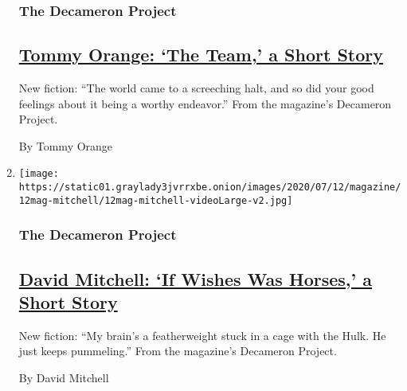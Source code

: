 \begin{enumerate}
{  \subsubsection{The Decameron Project}\label{the-decameron-project-1}}

  \hypertarget{tommy-orange-the-team-a-short-story}{%
  \subsection{\texorpdfstring{\href{/interactive/2020/07/07/magazine/tommy-orange-short-story.html}{Tommy
  Orange: `The Team,' a Short
  Story}}{Tommy Orange: `The Team,' a Short Story}}\label{tommy-orange-the-team-a-short-story}}

  New fiction: ``The world came to a screeching halt, and so did your
  good feelings about it being a worthy endeavor.'' From the magazine's
  Decameron Project.

  By Tommy Orange
\item
  \texttt{[image: https://static01.graylady3jvrrxbe.onion/images/2020/07/12/magazine/12mag-mitchell/12mag-mitchell-videoLarge-v2.jpg]}

  \hypertarget{the-decameron-project-2}{%
  \subsubsection{The Decameron Project}\label{the-decameron-project-2}}

  \hypertarget{david-mitchell-if-wishes-was-horses-a-short-story}{%
  \subsection{\texorpdfstring{\href{/interactive/2020/07/07/magazine/david-mitchell-short-story.html}{David
  Mitchell: `If Wishes Was Horses,' a Short
  Story}}{David Mitchell: `If Wishes Was Horses,' a Short Story}}\label{david-mitchell-if-wishes-was-horses-a-short-story}}

  New fiction: ``My brain's a featherweight stuck in a cage with the
  Hulk. He just keeps pummeling.'' From the magazine's Decameron
  Project.

  By David Mitchell
\end{enumerate}

